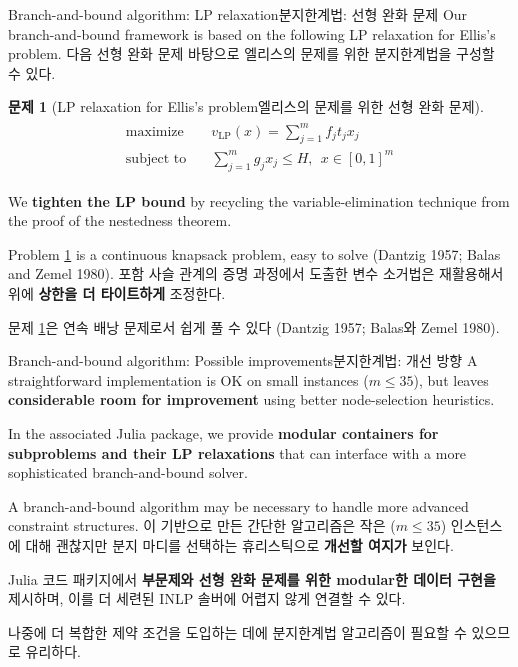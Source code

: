 \documentclass[11pt,mathserif,notheorems]{beamer}
\theoremstyle{definition}
\newtheorem{problem}{Problem}
\theoremstyle{definition}
\newtheorem{problem}{문제}
\begin{document}
\begin{frame}{\ifen Branch-and-bound algorithm: LP relaxation\else 분지한계법: 선형 완화 문제\fi}
\ifen
Our branch-and-bound framework is based on the following LP relaxation for Ellis's problem. 
\else
다음 선형 완화 문제 바탕으로 엘리스의 문제를 위한 분지한계법을 구성할 수 있다. 
\fi
\begin{problem}[\ifen LP relaxation for Ellis's problem\else 엘리스의 문제를 위한 선형 완화 문제\fi]\label{LPrelaxation}
\vspace{-2em}
\begin{align*}
\begin{split}
\text{maximize}\quad &  v_{\mathrm{LP}}(x) = \sum_{j=1}^m  f_j t_j x_j \\
\text{subject to}\quad & \sum_{j=1}^m g_j x_j \leq H, ~~ x \in [0, 1]^m
\end{split}
\end{align*}
\end{problem}
\ifen
We \textbf{tighten the LP bound} by recycling the variable-elimination technique from the proof of the nestedness theorem.

Problem \ref{LPrelaxation} is a continuous knapsack problem, easy to solve (Dantzig 1957; Balas and Zemel 1980). 
\else
포함 사슬 관계의 증명 과정에서 도출한 변수 소거법은 재활용해서 위에 \textbf{상한을 더 타이트하게} 조정한다.

문제 \ref{LPrelaxation}은 연속 배낭 문제로서 쉽게 풀 수 있다 (Dantzig 1957; Balas와 Zemel 1980). 
\fi
\end{frame}






\begin{frame}{\ifen Branch-and-bound algorithm: Possible improvements\else 분지한계법: 개선 방향\fi}
\ifen
A straightforward implementation is OK on small instances ($m \leq 35$), but leaves \textbf{considerable room for improvement} using better node-selection heuristics.


In the associated Julia package, we provide \textbf{modular containers for subproblems and their LP relaxations} that can interface with a more sophisticated branch-and-bound solver.

A branch-and-bound algorithm may be necessary to handle more advanced constraint structures.
\else
이 기반으로 만든 간단한 알고리즘은 작은 ($m \leq 35$) 인스턴스에 대해 괜찮지만 분지 마디를 선택하는 휴리스틱으로 \textbf{개선할 여지가} 보인다.

Julia 코드 패키지에서 \textbf{부문제와 선형 완화 문제를 위한 modular한 데이터 구현을} 제시하며, 이를 더 세련된 INLP 솔버에 어렵지 않게 연결할 수 있다.

나중에 더 복합한 제약 조건을 도입하는 데에 분지한계법 알고리즘이 필요할 수 있으므로 유리하다.
\fi
\end{frame}
\end{document}
